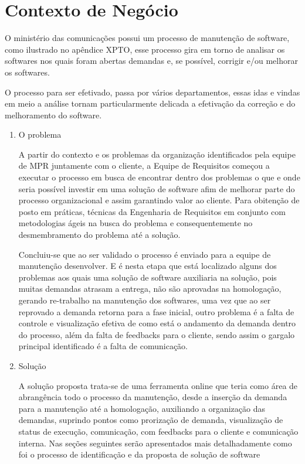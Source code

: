\chapter[Contexto de Negócio]{Contexto de Negócio}

O ministério das comunicações possui um processo de manutenção de software, como ilustrado no apêndice XPTO, esse processo gira em torno de analisar os softwares nos quais foram abertas demandas e, se possível, corrigir e/ou melhorar os softwares. 

O processo para ser efetivado, passa por vários departamentos, essas idas e vindas em meio a análise tornam particularmente delicada a efetivação da correção e do melhoramento do software. 

\begin{enumerate}[label=(\roman*)]
\item O problema

A partir do contexto e os problemas da organização identificados pela equipe de MPR juntamente com o cliente, a Equipe de Requisitos começou a executar o processo em busca de encontrar dentro dos problemas o que e onde seria possível investir em uma solução de  software afim de melhorar parte do processo organizacional e assim garantindo valor ao cliente. Para obitenção de posto em práticas, técnicas da Engenharia de Requisitos em conjunto com metodologias ágeis na busca do problema e consequentemente no desmembramento do problema até a solução.

Concluiu-se que ao ser validado o processo é enviado para a equipe de manutenção desenvolver. E é nesta etapa que está localizado alguns dos problemas aos quais uma solução de software auxiliaria na solução, pois muitas demandas atrasam a entrega, não são aprovadas na homologação, gerando re-trabalho na manutenção dos softwares, uma vez que ao ser reprovado a demanda retorna para a fase inicial, outro problema é a falta de controle e visualização efetiva de como está o andamento da demanda dentro do processo, além da falta de feedbacks para o cliente, sendo assim o gargalo principal identificado é a falta de comunicação.

\item Solução

A solução proposta trata-se de uma ferramenta online que teria como área de abrangência todo o processo da manutenção, desde a inserção da demanda para a manutenção até a homologação, auxiliando a organização das demandas, suprindo pontos como prorização de demanda, visualização de status de execução, comunicação, com feedbacks para o cliente e comunicação interna. Nas seções seguintes serão apresentados mais detalhadamente como foi o processo de identificação e da proposta de solução de software

\end{enumerate}